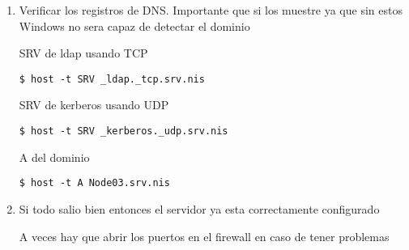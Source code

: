\documentclass[../main.tex]{subfiles}
\begin{document}
\begin{enumerate}
        En el caso anterior se mostró los directorios configurados y
    		los workgroups existentes de otras maquinas Windows en la red.

        Verificar la autenticación usando el usuario de administrador del dominio.
        \begin{listing}[H]
\begin{verbatim}
$ smbclient //localhost/netlogon -UAdministrator -c 'ls'
\end{verbatim}
\end{listing}

        Si todo sale bien debe mostrar lo siguiente:
        \begin{listing}[H]
\begin{verbatim}
Enter SRV\Administrator's password:
  .                                   D        0  Sun May 10 20:07:09 2020
  ..                                  D        0  Sun May 10 20:07:12 2020

                19478160 blocks of size 1024. 17106040 blocks available

\end{verbatim}
\end{listing}

  \item Verificar los registros de DNS. Importante que si los muestre ya 
    		que sin estos Windows no sera capaz de detectar el dominio
    		
    		SRV de ldap usando TCP

    		\begin{listing}[H]
\begin{verbatim}
$ host -t SRV _ldap._tcp.srv.nis
\end{verbatim}
\end{listing}

        SRV de kerberos usando UDP
        \begin{listing}[H]
\begin{verbatim}
$ host -t SRV _kerberos._udp.srv.nis
\end{verbatim}
\end{listing}

        A del dominio
        \begin{listing}[H]
\begin{verbatim}
$ host -t A Node03.srv.nis
\end{verbatim}
\end{listing}

  \item Si todo salio bien entonces el servidor ya esta correctamente configurado

        A veces hay que abrir los puertos en el firewall en caso de tener problemas





\end{enumerate}
\end{document}
